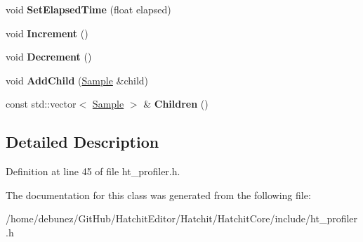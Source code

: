 \begin{DoxyCompactItemize}
\item 
void {\bfseries Set\+Elapsed\+Time} (float elapsed)\hypertarget{classHatchit_1_1Core_1_1Profiler_1_1Sample_a6147e57591cddf7a0d3ef5840985a225}{}\label{classHatchit_1_1Core_1_1Profiler_1_1Sample_a6147e57591cddf7a0d3ef5840985a225}

\item 
void {\bfseries Increment} ()\hypertarget{classHatchit_1_1Core_1_1Profiler_1_1Sample_a2130172aa15536fd73b70d9e47f6346a}{}\label{classHatchit_1_1Core_1_1Profiler_1_1Sample_a2130172aa15536fd73b70d9e47f6346a}

\item 
void {\bfseries Decrement} ()\hypertarget{classHatchit_1_1Core_1_1Profiler_1_1Sample_aa5f5db9feca34cc338440554ca1234a3}{}\label{classHatchit_1_1Core_1_1Profiler_1_1Sample_aa5f5db9feca34cc338440554ca1234a3}

\item 
void {\bfseries Add\+Child} (\hyperlink{classHatchit_1_1Core_1_1Profiler_1_1Sample}{Sample} \&child)\hypertarget{classHatchit_1_1Core_1_1Profiler_1_1Sample_ad638b416c1d512383a2f5cc53531200b}{}\label{classHatchit_1_1Core_1_1Profiler_1_1Sample_ad638b416c1d512383a2f5cc53531200b}

\item 
const std\+::vector$<$ \hyperlink{classHatchit_1_1Core_1_1Profiler_1_1Sample}{Sample} $>$ \& {\bfseries Children} ()\hypertarget{classHatchit_1_1Core_1_1Profiler_1_1Sample_acae871ed9cac913f3b2c117c5c6f6fdb}{}\label{classHatchit_1_1Core_1_1Profiler_1_1Sample_acae871ed9cac913f3b2c117c5c6f6fdb}

\end{DoxyCompactItemize}


\subsection{Detailed Description}


Definition at line 45 of file ht\+\_\+profiler.\+h.



The documentation for this class was generated from the following file\+:\begin{DoxyCompactItemize}
\item 
/home/debunez/\+Git\+Hub/\+Hatchit\+Editor/\+Hatchit/\+Hatchit\+Core/include/ht\+\_\+profiler.\+h\end{DoxyCompactItemize}
